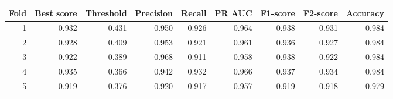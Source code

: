 \begin{tabular}{rrrrrrrrr}
\toprule
Fold & Best score & Threshold & Precision & Recall & PR AUC & F1-score & F2-score & Accuracy \\
\midrule
1 & 0.932 & 0.431 & 0.950 & 0.926 & 0.964 & 0.938 & 0.931 & 0.984 \\
2 & 0.928 & 0.409 & 0.953 & 0.921 & 0.961 & 0.936 & 0.927 & 0.984 \\
3 & 0.922 & 0.389 & 0.968 & 0.911 & 0.958 & 0.938 & 0.922 & 0.984 \\
4 & 0.935 & 0.366 & 0.942 & 0.932 & 0.966 & 0.937 & 0.934 & 0.984 \\
5 & 0.919 & 0.376 & 0.920 & 0.917 & 0.957 & 0.919 & 0.918 & 0.979 \\
\bottomrule
\end{tabular}
